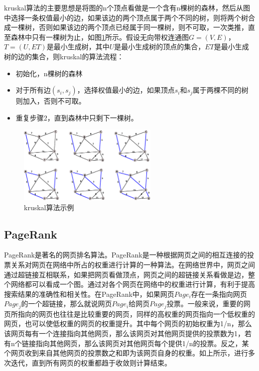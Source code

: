 kruskal算法的主要思想是将图的n个顶点看做是一个含有n棵树的森林，然后从图中选择一条权值最小的边，如果该边的两个顶点属于两个不同的树，则将两个树合成一棵树，否则如果该边的两个顶点已经属于同一棵树，则不可取，一次类推，直至森林中只有一棵树为止，如图\ref{fig:kruskal}所示。假设无向带权连通图$G=(V,E)$，$T=(U,ET)$是最小生成树，其中$U$是最小生成树的顶点的集合，$ET$是最小生成树的边的集合，则kruskal的算法流程：
\begin{itemize}
\item 初始化，n棵树的森林
\item 对于所有边$(s_i,s_j)$，选择权值最小的边，如果顶点$s_i$和$s_j$属于两棵不同的树则加入，否则不可取。
\item 重复步骤2，直到森林中只剩下一棵树。
\end{itemize}

\begin{figure}[htbp]
\centering
\includegraphics[width=0.6\textwidth]{myfigures/kruskal}
\caption{kruskal算法示例}\label{fig:kruskal}
\vspace{\baselineskip}
\end{figure}

\subsection{PageRank}

PageRank是著名的网页排名算法。PageRank是一种根据网页之间的相互连接的投票关系对网页在网络中所占的权重进行计算的一种算法。在网络世界中，网页之间通过超链接互相联系，如果把网页看做顶点，网页之间的超链接关系看做是边，整个网络都可以看成一个图。通过对各个网页在网络中的权重进行计算，有利于提高搜索结果的准确性和相关性。在PageRank中，如果网页$Page_i$存在一条指向网页$Page_j$的一个超链接，那么就说网页$Page_i$给网页$Page_j$投票。一般来说，重要的网页所指向的网页也往往是比较重要的网页，同样的高权重的网页指向一个低权重的网页，也可以使低权重的网页的权重提升。其中每个网页的初始权重为1/n，那么该网页每有一个连接指向其他网页，那么该网页对其他网页提供的投票数为1，若有n个链接指向其他网页，那么该网页对其他网页每个提供1/n的投票。反之，某个网页收到来自其他网页的投票数之和即为该网页自身的权重。如上所示，进行多次迭代，直到所有网页的权重都趋于收敛则计算结束。

